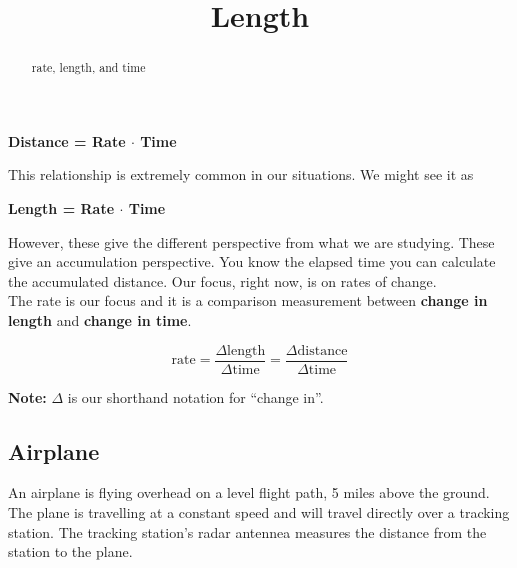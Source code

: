 \documentclass{ximera}
\title{Length}
\begin{document}
\begin{abstract}
rate, length, and time
\end{abstract}
\maketitle




\begin{center}
\textbf{\textcolor{purple!85!blue}{Distance = Rate $\cdot$ Time}} 
\end{center}

This relationship is extremely common in our situations.  We might see it as



\begin{center}
\textbf{\textcolor{purple!85!blue}{Length = Rate $\cdot$ Time}} 
\end{center}



However, these give the different perspective from what we are studying.  These give an accumulation perspective. You  know the elapsed time you can calculate the accumulated distance.  Our focus, right now, is on rates of change. \\


The rate is our focus and it is a comparison measurement between \textbf{\textcolor{red!80!black}{change in length}} and \textbf{\textcolor{red!80!black}{change in time}}.



\[
\text{rate} = \frac{\Delta \text{length}}{\Delta \text{time}} = \frac{\Delta \text{distance}}{\Delta \text{time}}
\]

\textbf{Note:} $\Delta$ is our shorthand notation for ``change in''. \\






\subsection{Airplane}

An airplane is flying overhead on a level flight path, 5 miles above the ground.  The plane is travelling at a constant speed and will travel directly over a tracking station. The tracking station's radar antennea measures the distance from the station to the plane.
\end{document}
